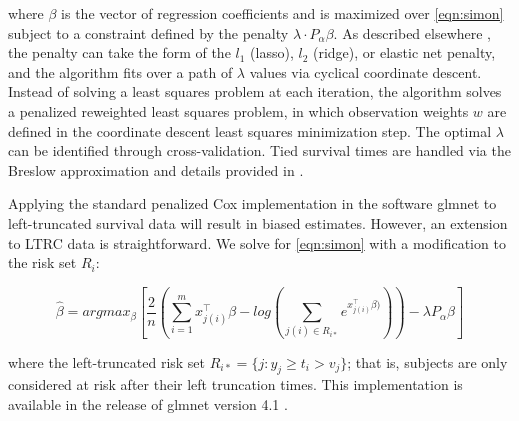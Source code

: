 \documentclass[11pt,final,fleqn]{article}\usepackage[]{graphicx}\usepackage[]{color}
\theoremstyle{plain}
\newcommand{\pkg}[1]{{\fontseries{b}\selectfont #1}}
\begin{document}
where $\beta$ is the vector of regression coefficients and is maximized over \autoref{eqn:simon} subject to a constraint defined by the penalty $\lambda \cdot P_{\alpha}\beta$. As described elsewhere \cite{simon2011regularization}, the penalty can take the form of the $l_1$ (lasso), $l_2$ (ridge), or elastic net penalty,  and the algorithm fits over a path of $\lambda$ values via cyclical coordinate descent. Instead of solving a least squares problem at each iteration, the algorithm solves a penalized reweighted least squares problem, in which observation weights $w$ are defined in the coordinate descent least squares minimization step. The optimal $\lambda$ can be identified through cross-validation. Tied survival times are handled via the Breslow approximation \cite{breslow1972} and details provided in \cite{simon2011regularization}.

Applying the standard penalized Cox implementation in the software \pkg{glmnet} to left-truncated survival data will result in biased estimates. However, an extension to LTRC data is straightforward. We solve for \autoref{eqn:simon} with a modification to the risk set $R_i$:

\begin{equation}
\hat{\beta} = argmax_{\beta}  \left[ \frac{2}{n} \left( \sum_{i=1}^m x_{j(i)}^\intercal\beta - log\left(\sum_{j(i)\in R_{i\ast}}  e^{x_{j(i)}^\intercal\beta)}\right) \right)  - \lambda P_{\alpha}\beta  \right] 
\end{equation}

where the left-truncated risk set $R_{i\ast} = \{ j : y_j \geq t_i > v_j \}$; that is, subjects are only considered at risk after their left truncation times. This implementation is available in the release of \pkg{glmnet} version 4.1 \cite{glmnet}.
\end{document}
